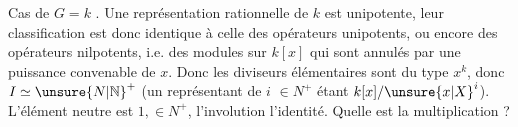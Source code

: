 Cas de $G=k$ . Une représentation rationnelle
de $k$ est unipotente, leur classification est donc
identique à celle des opérateurs unipotents,
ou encore des opérateurs nilpotents, i.e.
des modules sur $k[x]$ qui sont
annulés par une puissance convenable de $x$.
Donc les diviseurs élémentaires sont du type
$x^k$, donc $I\simeq {\unsure{N|\mathbb N}}^+$ (un représentant de $i$
 $\in N^+$ étant $k[x]/{\unsure{x|X}}^i$). L'élément
neutre est $1,\in N^+$, l'involution l'identité.
Quelle est la multiplication ?
